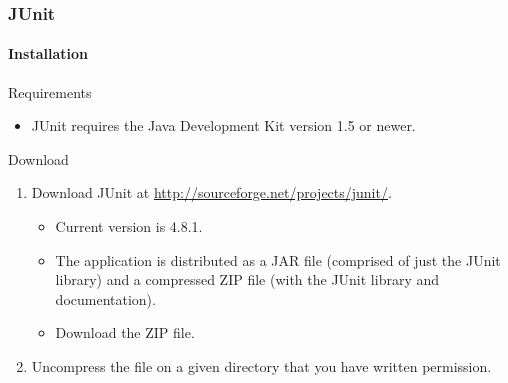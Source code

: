 \begin{frame}[hasprev=true, hasnext=true]
\frametitle{JUnit}
\framesubtitle{Installation}
\label{procedure:junit:installation}


\begin{block:fact}{Requirements}
\begin{itemize}
	\item JUnit requires the Java Development Kit version 1.5 or newer.
\end{itemize}
\end{block:fact}

\begin{block:procedure}{Download}
\begin{enumerate}
	\item Download JUnit at \url{http://sourceforge.net/projects/junit/}.
	\begin{itemize}
		\item Current version is 4.8.1.

		\item The application is distributed as a JAR file (comprised of just
		the JUnit library) and a compressed ZIP file (with the JUnit library
		and documentation).

		\item Download the ZIP file.
	\end{itemize}

	\item Uncompress the file on a given directory that you have written
	permission.
\end{enumerate}
\end{block:procedure}
\end{frame}


